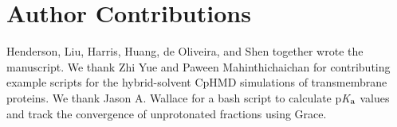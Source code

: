 \documentclass[9pt,tutorial]{livecoms}
\newcommand{\pka}{p\textit{K}$_{\rm a}$}
\newcommand{\githubrepository}{\url{https://gitlab.com/shenlab-amber-cphmd/cphmd-tutorial}}  %
\begin{document}















\section{Author Contributions}
%
Henderson, Liu, Harris, Huang, de Oliveira, and Shen
together wrote the manuscript.
We thank Zhi Yue and Paween Mahinthichaichan for contributing example scripts for the hybrid-solvent CpHMD simulations of transmembrane proteins.
We thank Jason A. Wallace for a bash script to calculate {\pka} values and track the convergence of unprotonated fractions using Grace.

%

\end{document}
